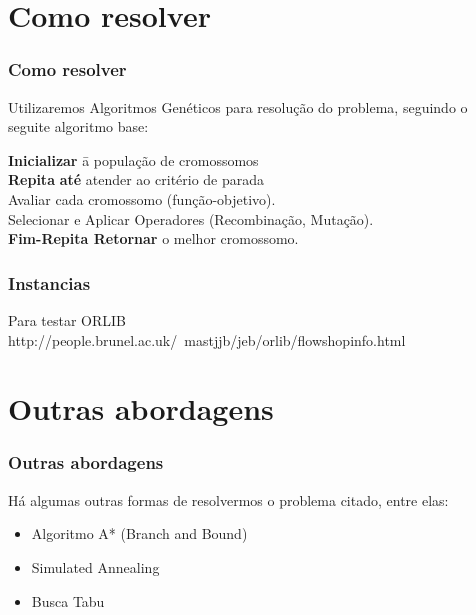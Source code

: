 \documentclass[12pt]{beamer}
\begin{document}
\section{Como resolver} 
\begin{frame} 
        \frametitle{Como resolver}
        \begin{block}{Utilizaremos Algoritmos Genéticos para resolução do problema, seguindo o seguite algoritmo base:}
	\begin{tabbing}
	{\bf Inicializar} \= a população de cromossomos \\
	{\bf Repita} \= {\bf até} atender ao critério de parada \\
	\> Avaliar cada cromossomo (função-objetivo). \\
	\> Selecionar e Aplicar Operadores (Recombinação, Mutação).\\
	{\bf Fim-Repita Retornar} o melhor cromossomo.
	\end{tabbing}
	\end{block}
\end{frame}
\begin{frame}
	\frametitle{Instancias}
	\begin{block}{Para testar}
		ORLIB http://people.brunel.ac.uk/~mastjjb/jeb/orlib/flowshopinfo.html
	\end{block}
\end{frame}

\section{Outras abordagens} 
\begin{frame} 
        \frametitle{Outras abordagens}
        \begin{block}{Há algumas outras formas de resolvermos o problema citado, entre elas:}
                \begin{itemize}
                        \item Algoritmo A* (Branch and Bound)    \pause
                        \item Simulated Annealing   \pause
                        \item Busca Tabu  \pause
                \end{itemize}
        \end{block}
\end{frame}
              
\end{document}
